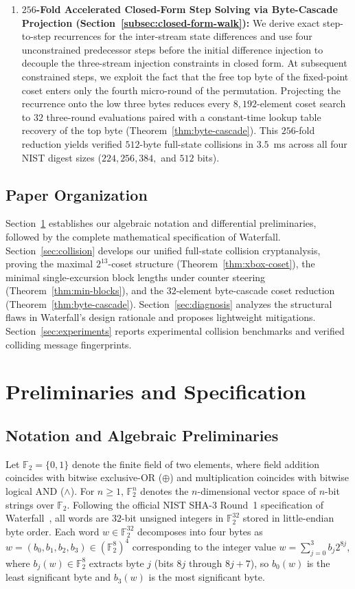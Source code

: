 \documentclass[11pt,a4paper]{article}
\theoremstyle{definition}
\theoremstyle{remark}
\newcommand{\Ftwo}{\mathbb{F}_2}
\begin{document}
\begin{enumerate}[leftmargin=2em]
    \item \textbf{$256$-Fold Accelerated Closed-Form Step Solving via Byte-Cascade Projection (Section~\ref{subsec:closed-form-walk}):} We derive exact step-to-step recurrences for the inter-stream state differences and use four unconstrained predecessor steps before the initial difference injection to decouple the three-stream injection constraints in closed form. At subsequent constrained steps, we exploit the fact that the free top byte of the fixed-point coset enters only the fourth micro-round of the permutation. Projecting the recurrence onto the low three bytes reduces every $8{,}192$-element coset search to $32$ three-round evaluations paired with a constant-time lookup table recovery of the top byte (Theorem~\ref{thm:byte-cascade}). This $256$-fold reduction yields verified $512$-byte full-state collisions in $3.5$~ms across all four NIST digest sizes ($224, 256, 384,$ and $512$ bits).
\end{enumerate}

\subsection{Paper Organization}
Section~\ref{sec:spec} establishes our algebraic notation and differential preliminaries, followed by the complete mathematical specification of Waterfall. Section~\ref{sec:collision} develops our unified full-state collision cryptanalysis, proving the maximal $2^{13}$-coset structure (Theorem~\ref{thm:xbox-coset}), the minimal single-excursion block lengths under counter steering (Theorem~\ref{thm:min-blocks}), and the $32$-element byte-cascade coset reduction (Theorem~\ref{thm:byte-cascade}). Section~\ref{sec:diagnosis} analyzes the structural flaws in Waterfall's design rationale and proposes lightweight mitigations. Section~\ref{sec:experiments} reports experimental collision benchmarks and verified colliding message fingerprints.

\section{Preliminaries and Specification}
\label{sec:spec}

\subsection{Notation and Algebraic Preliminaries}
\label{subsec:prelim}
Let $\Ftwo = \{0, 1\}$ denote the finite field of two elements, where field addition coincides with bitwise exclusive-OR ($\oplus$) and multiplication coincides with bitwise logical AND ($\wedge$). For $n \ge 1$, $\Ftwo^n$ denotes the $n$-dimensional vector space of $n$-bit strings over $\Ftwo$. Following the official NIST SHA-3 Round~1 specification of Waterfall~\cite{Hat08}, all words are $32$-bit unsigned integers in $\Ftwo^{32}$ stored in little-endian byte order. Each word $w \in \Ftwo^{32}$ decomposes into four bytes as $w = (b_0, b_1, b_2, b_3) \in (\Ftwo^8)^4$ corresponding to the integer value $w = \sum_{j=0}^{3} b_j 2^{8j}$, where $b_j(w) \in \Ftwo^8$ extracts byte $j$ (bits $8j$ through $8j+7$), so $b_0(w)$ is the least significant byte and $b_3(w)$ is the most significant byte.
\end{document}
